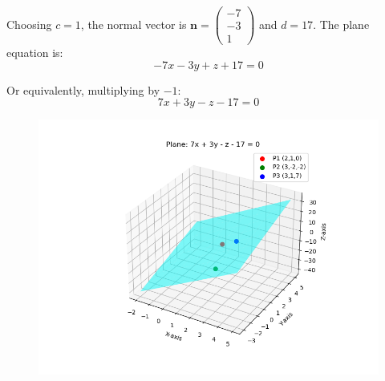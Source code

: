 \documentclass[journal]{IEEEtran}
\begin{document}
Choosing $c=1$, the normal vector is $\mathbf{n} = \begin{pmatrix} -7\\ -3\\ 1 \end{pmatrix}$ and $d=17$. The plane equation is:
\[
-7x - 3y + z + 17 = 0 \tag{12}
\]

Or equivalently, multiplying by $-1$:
\[
\boxed{7x + 3y - z - 17 = 0} \tag{13}
\]

\begin{figure}[H]
\begin{center}
\includegraphics[width=0.6\columnwidth]{figs/fig6.png}
\end{center}
\caption{}
\label{fig:Fig}
\end{figure}
\end{document}
